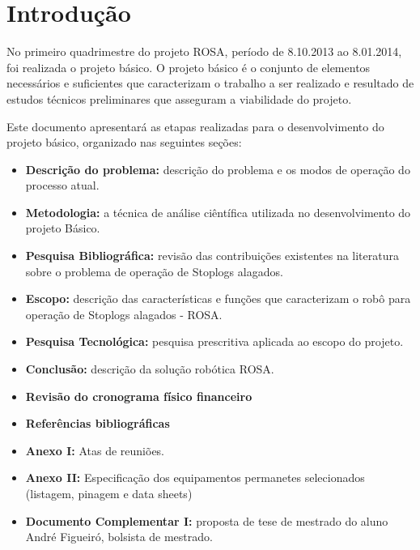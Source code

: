 


\section{Introdução}
No primeiro quadrimestre do projeto ROSA, período de 8.10.2013 ao 8.01.2014, foi realizada o projeto básico. O projeto básico é o conjunto de elementos necessários e suficientes que caracterizam o trabalho a ser realizado e resultado de estudos técnicos preliminares que asseguram a viabilidade do projeto. 

Este documento apresentará as etapas realizadas para o desenvolvimento do projeto básico, organizado nas seguintes seções:
    \begin{itemize}
        \item {\bf Descrição do problema:} descrição do problema e os modos de operação do processo atual.
	\item {\bf Metodologia:} a técnica de análise ciêntífica utilizada no desenvolvimento do projeto Básico.
        \item {\bf Pesquisa Bibliográfica:} revisão das contribuições existentes na literatura sobre o problema de operação de Stoplogs alagados.  
	\item {\bf Escopo:} descrição das características e funções que caracterizam o robô para operação de Stoplogs alagados - ROSA. 
        \item {\bf Pesquisa Tecnológica:} pesquisa prescritiva aplicada ao escopo do projeto. 
        \item {\bf Conclusão:} descrição da solução robótica ROSA. 
         \item {\bf Revisão do cronograma físico financeiro} 
        \item {\bf Referências bibliográficas}
        \item {\bf Anexo I:} Atas de reuniões. 
        \item {\bf Anexo II:} Especificação dos equipamentos permanetes selecionados (listagem, pinagem e data sheets) 
        \item { \bf Documento Complementar I:} proposta de tese de mestrado do aluno André Figueiró, bolsista de mestrado. 

    \end{itemize}
